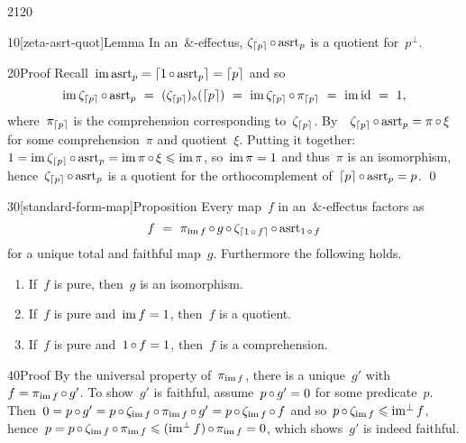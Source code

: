\begin{parsec}{2120}%
\begin{point}{10}[zeta-asrt-quot]{Lemma}%
    In an~$\&$-effectus,
    $\zeta_{\left\lceil p\right\rceil} \mathop{\circ} \mathrm{asrt}_p$
    is a quotient for~$p^\perp$.
\begin{point}{20}{Proof}%
Recall~$\operatorname{im} \mathrm{asrt}_p = \left\lceil1 \mathop{\circ} \mathrm{asrt}_p\right\rceil = \left\lceil p\right\rceil$ and so
\begin{equation*}
\operatorname{im} \zeta_{\left\lceil p\right\rceil} \mathop{\circ} \mathrm{asrt}_p
\ =\  (\zeta_{\left\lceil p\right\rceil})_\diamond( \left\lceil p\right\rceil)
\ =\  \operatorname{im} \zeta_{\left\lceil p\right\rceil} \mathop{\circ} \pi_{\left\lceil p\right\rceil}
\ =\  \operatorname{im} \mathrm{id} \ =\  1,
\end{equation*}
where~$\pi_{\left\lceil p\right\rceil}$ is the comprehension corresponding to~$\zeta_{\left\lceil p\right\rceil}$.
By~~$\zeta_{\left\lceil p\right\rceil} \mathop{\circ} \mathrm{asrt}_p = \pi \mathop{\circ} \xi$
    for some comprehension~$\pi$ and quotient~$\xi$.
Putting it together:
$1 = \operatorname{im} \zeta_{\left\lceil p\right\rceil} \mathop{\circ} \mathrm{asrt}_p = \operatorname{im} \pi \mathop{\circ} \xi \leqslant \operatorname{im} \pi$,
so~$\operatorname{im} \pi = 1$ and thus~$\pi$ is an isomorphism,
hence~$\zeta_{\left\lceil p\right\rceil}\mathop{\circ} \mathrm{asrt}_p$
is a quotient for the orthocomplement of~$\left\lceil p\right\rceil \mathop{\circ} \mathrm{asrt}_p = p$. \qed
\end{point}
\end{point}
\begin{point}{30}[standard-form-map]{Proposition}%
Every map~$f$
in an~$\&$-effectus
factors as
\begin{equation}\label{eq-standard-form-map}
        f \ =\ \pi_{\operatorname{im} f} \mathop{\circ} g \mathop{\circ} \zeta_{\left\lceil1 \mathop{\circ} f\right\rceil} \mathop{\circ} \mathrm{asrt}_{1 \mathop{\circ} f} 
    \end{equation}
    for a unique total and faithful map~$g$.
Furthermore the following holds.
\begin{enumerate}
\item
If~$f$ is pure, then~$g$ is an isomorphism.
\item
If~$f$ is pure and~$\operatorname{im} f = 1$, then~$f$ is a quotient.
\item
If~$f$ is pure and~$1 \mathop{\circ} f = 1$, then~$f$ is a comprehension.
\end{enumerate}
\spacingfix{}
\begin{point}{40}{Proof}%
By the universal property of~$\pi_{\operatorname{im} f}$,
    there is a unique~$g'$ with~$f = \pi_{\operatorname{im} f} \mathop{\circ} g'$.
To show~$g'$ is faithful, assume~$p\mathop{\circ} g' = 0$
    for some predicate~$p$.
Then~$0 = p \mathop{\circ} g' = p \mathop{\circ} \zeta_{\operatorname{im} f} \mathop{\circ} \pi_{\operatorname{im} f} \mathop{\circ} g'
                = p \mathop{\circ} \zeta_{\operatorname{im} f} \mathop{\circ} f$
    and so~$p \mathop{\circ} \zeta_{\operatorname{im} f} \leqslant \operatorname{im^\perp} f$,
    hence~$p = p \mathop{\circ} \zeta_{\operatorname{im} f} \mathop{\circ} \pi_{\operatorname{im} f}
                \leqslant (\operatorname{im^\perp} f )\mathop{\circ} \pi_{\operatorname{im} f} = 0$, which
                shows~$g'$ is indeed faithful.


\end{point}
\end{point}
\end{parsec}
